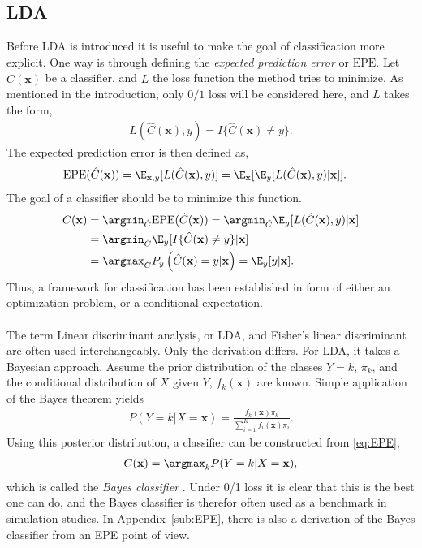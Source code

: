 \subsection{LDA}
\label{sub:LDA}
Before LDA is introduced it is useful to make the goal of classification more explicit. One way is through defining the \textit{expected prediction error} or $\mathrm{EPE}$.
Let $\hat C(\mathbf{x})$ be a classifier, and $L$ the loss function the method tries to minimize. As mentioned in the introduction, only $0/1$ loss will be considered here, and $L$ takes the form,
\begin{align}
  L(\hat C(\mathbf{x}), y) = I\{ \hat C(\mathbf{x}) \neq y \}. 
\end{align}
The expected prediction error is then defined as,
\begin{align}
  \mathrm{EPE}(\hat C(\mathbf{x})) 
  &= \E_{\mathbf{x}, y}[L(\hat C(\mathbf{x}), y)] = \E_{\mathbf{x}}[\E_{y}[L(\hat C(\mathbf{x}), y) | \mathbf{x}]].
\end{align}
The goal of a classifier should be to minimize this function.
\begin{align}
  C(\mathbf{x}) 
  &= \argmin_{\hat C} \mathrm{EPE}(\hat C(\mathbf{x})) = \argmin_{\hat C} \E_{y}[L(\hat C(\mathbf{x}), y) | \mathbf{x}] \notag \\
  &= \argmin_{\hat C} \E_{y}[I\{\hat C(\mathbf{x}) \neq y \} | \mathbf{x}] \notag \\
  \label{eq:EPE} 
  &= \argmax_{\hat C} P_{y}\left(\hat C(\mathbf{x}) = y  | \mathbf{x}  \right) = \E_y [y | \mathbf{x}].
\end{align}
Thus, a framework for classification has been established in form of either an optimization problem, or a conditional expectation.
\\
\\
The term Linear discriminant analysis, or LDA, and Fisher's linear discriminant are often used interchangeably. Only the derivation differs. For LDA, it takes a Bayesian approach. 
Assume the prior distribution of the classes $Y=k$, $\pi_k$, and the conditional distribution of $X$ given $Y$, $f_k(\mathbf{x})$ are known. Simple application of the Bayes theorem yields 
\begin{align}
  P(Y=k|X=\mathbf{x}) = \frac{f_k(\mathbf{x}) \pi_k}{\sum^{K}_{i=1} f_i(\mathbf{x})\pi_i} .
\end{align}
Using this posterior distribution, a classifier can be constructed from \eqref{eq:EPE},
\begin{align}
  \label{eq:bayesian} 
  C(\mathbf{x}) = \argmax_k P(Y=k|X=\mathbf{x}),
\end{align}
which is called the \textit{Bayes classifier} \cite[p.~21]{modstat}. Under 0/1 loss it is clear that this is the best one can do, and the Bayes classifier is therefor often used as a benchmark in simulation studies. In Appendix~\ref{sub:EPE}, there is also a derivation of the Bayes classifier from an EPE point of view. 

